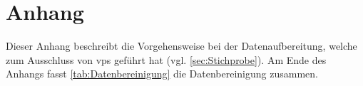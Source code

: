 \documentclass[11pt, twoside, a4paper]{book}		%
\begin{document}
\cleardoublepage								%
\renewcommand\bibname{Literatur}				%


\cleardoublepage								%
\renewcommand\listfigurename{Abbildungen}		%
\listoffigures									%

\cleardoublepage								%
\renewcommand\listtablename{Tabellen}			%
\listoftables 									%

\appendix
\setcounter{figure}{0}
\renewcommand\thefigure{\Alph{appndx}\@arabic\c@figure}

\chapter[Anhang - Datenaufbereitung]{Anhang \label{cha:Anhang_A}}

\setcounter{table}{0}
\renewcommand{\thetable}{A\arabic{table}}

Dieser Anhang beschreibt die Vorgehensweise bei der Datenaufbereitung, welche zum Ausschluss von \glspl{vp} geführt hat (vgl. \autoref{sec:Stichprobe}). Am Ende des Anhangs fasst \autoref{tab:Datenbereinigung} die Datenbereinigung zusammen.
\end{document}
